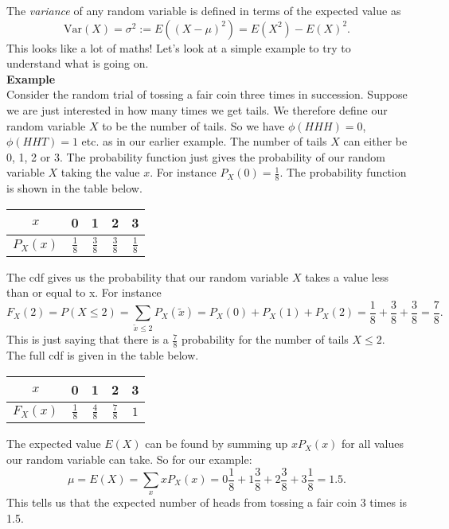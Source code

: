The {\em variance} of any random variable is defined in terms of the expected value as
\begin{equation*}
\text{Var}(X)=\sigma^{2}:=E((X-\mu)^{2})=E(X^{2})-E(X)^{2}.
\end{equation*}
This looks like a lot of maths! Let's look at a simple example to try to understand what is going on.\\
\newline
{\bf Example}\\
Consider the random trial of tossing a fair coin three times in succession. Suppose we are just interested in how many times we get tails. We therefore define our random variable $X$ to be the number of tails. So we have $\phi(HHH)=0$, $\phi(HHT)=1$ etc. as in our earlier example. The number of tails $X$ can either be 0, 1, 2 or 3. The probability function just gives the probability of our random variable $X$ taking the value $x$. For instance $P_{X}(0)=\frac{1}{8}$. The probability function is shown in the table below. 

\begin{center}
\begin{tabular}{ |c|c|c|c|c| } 
 \hline
 $x$ & 0 & 1 & 2 & 3 \\ 
\hline $P_{X} (x)$& $\frac{1}{8}$ & $\frac{3}{8}$ & $\frac{3}{8}$ & $\frac{1}{8}$ \\
 \hline
\end{tabular}
\end{center}

The cdf gives us the probability that our random variable $X$ takes a value less than or equal to x. For instance
\begin{equation*}
F_{X}(2)=P(X\leq 2)=\sum_{\tilde{x} \leq 2} P_{X}(\tilde{x})=P_{X}(0)+P_{X}(1)+P_X(2)=\frac{1}{8}+\frac{3}{8}+\frac{3}{8}=\frac{7}{8}.
\end{equation*}
This is just saying that there is a $\frac{7}{8}$ probability for the number of tails $X\leq 2$. The full cdf is given in the table below.

\begin{center}
\begin{tabular}{ |c|c|c|c|c| } 
 \hline
 $x$ & 0 & 1 & 2 & 3 \\ 
\hline $F_{X} ( x)$& $\frac{1}{8}$ & $\frac{4}{8}$ & $\frac{7}{8}$ & $1$ \\
 \hline
\end{tabular}
\end{center}

The expected value $E(X)$ can be found by summing up $x P_{X}(x)$ for all values our random variable can take. So for our example:
\begin{equation*}
 \mu=E(X)=\sum_{x} x P_{X}(x)=0 \frac{1}{8}+1 \frac{3}{8} + 2 \frac{3}{8} + 3\frac{1}{8}=1.5.
\end{equation*}
This tells us that the expected number of heads from tossing a fair coin 3
times is 1.5.

